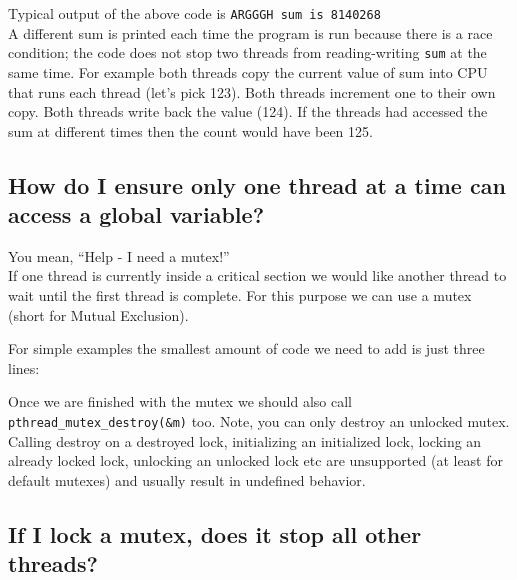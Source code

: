 Typical output of the above code is \texttt{ARGGGH\ sum\ is\ 8140268}\\A
different sum is printed each time the program is run because there is a
race condition; the code does not stop two threads from reading-writing
\texttt{sum} at the same time. For example both threads copy the current
value of sum into CPU that runs each thread (let's pick 123). Both
threads increment one to their own copy. Both threads write back the
value (124). If the threads had accessed the sum at different times then
the count would have been 125.

\subsection{How do I ensure only one thread at a time can access a
global
variable?}\label{how-do-i-ensure-only-one-thread-at-a-time-can-access-a-global-variable}

You mean, ``Help - I need a mutex!''\\If one thread is currently inside
a critical section we would like another thread to wait until the first
thread is complete. For this purpose we can use a mutex (short for
Mutual Exclusion).

For simple examples the smallest amount of code we need to add is just
three lines:

\begin{Shaded}
\begin{Highlighting}[]
\end{Highlighting}
\end{Shaded}

Once we are finished with the mutex we should also call
\texttt{pthread\_mutex\_destroy(\&m)} too. Note, you can only destroy an
unlocked mutex. Calling destroy on a destroyed lock, initializing an
initialized lock, locking an already locked lock, unlocking an unlocked
lock etc are unsupported (at least for default mutexes) and usually
result in undefined behavior.

\subsection{If I lock a mutex, does it stop all other
threads?}\label{if-i-lock-a-mutex-does-it-stop-all-other-threads}

